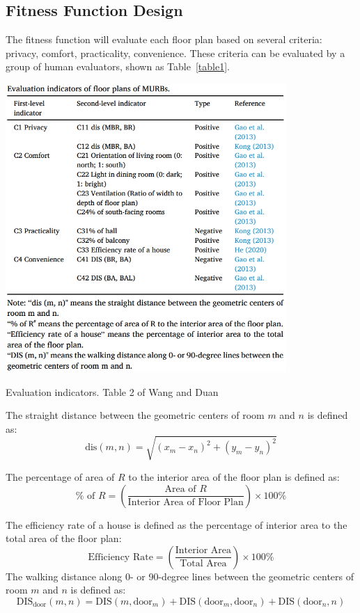 \documentclass[]{article}
\begin{document}
\subsection{Fitness Function Design}
The fitness function will evaluate each floor plan based on several criteria:
privacy, comfort, practicality, convenience.
These criteria can be evaluated by a group of human evaluators, shown as Table~\ref{table1}.
\begin{table}[h]
    \centering
    \includegraphics[width=0.8\textwidth]{image1.png}
    \caption{Evaluation indicators. Table 2 of Wang and Duan\cite{WANG2023100238}}\label{table1}
\end{table}

The straight distance between the geometric centers of room $m$ and $n$ is defined as:
\begin{equation*}
    \text{dis}(m, n) = \sqrt{(x_m - x_n)^2 + (y_m - y_n)^2}
\end{equation*}

The percentage of area of $R$ to the interior area of the floor plan is defined as:
\begin{equation*}
    \% \text{ of } R = \left( \frac{\text{Area of } R}{\text{Interior Area of Floor Plan}} \right) \times 100\%
\end{equation*}

The efficiency rate of a house is defined as the percentage of interior area to the total area of the floor plan:
\begin{equation*}
    \text{Efficiency Rate} = \left( \frac{\text{Interior Area}}{\text{Total Area}} \right) \times 100\%
\end{equation*}
The walking distance along 0- or 90-degree lines between the geometric centers of room $m$ and $n$ is defined as:
\begin{equation*}
    \text{DIS}_{\text{door}}(m, n) = \text{DIS}(m, \text{door}_m) + \text{DIS}(\text{door}_m, \text{door}_n) + \text{DIS}(\text{door}_n, n)
\end{equation*}
\end{document}
